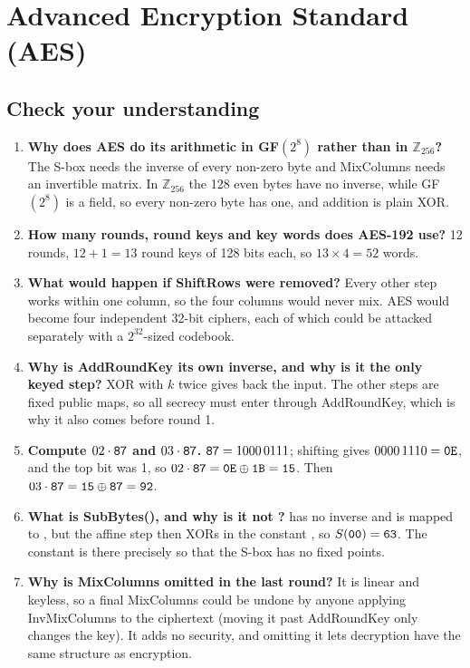 \section{Advanced Encryption Standard (AES)}\label{q:16_aes}

\subsection*{Check your understanding}
\begin{enumerate}[leftmargin=1.5em,itemsep=2pt]
  \item \textbf{Why does AES do its arithmetic in GF$(2^8)$ rather than in $\mathbb{Z}_{256}$?} The S-box needs the inverse of every non-zero byte and MixColumns needs an invertible matrix. In $\mathbb{Z}_{256}$ the 128 even bytes have no inverse, while GF$(2^8)$ is a field, so every non-zero byte has one, and addition is plain XOR.
  \item \textbf{How many rounds, round keys and key words does AES-192 use?} 12 rounds, $12 + 1 = 13$ round keys of 128 bits each, so $13 \times 4 = 52$ words.
  \item \textbf{What would happen if ShiftRows were removed?} Every other step works within one column, so the four columns would never mix. AES would become four independent 32-bit ciphers, each of which could be attacked separately with a $2^{32}$-sized codebook.
  \item \textbf{Why is AddRoundKey its own inverse, and why is it the only keyed step?} XOR with $k$ twice gives back the input. The other steps are fixed public maps, so all secrecy must enter through AddRoundKey, which is why it also comes before round 1.
  \item \textbf{Compute $02 \cdot \texttt{87}$ and $03 \cdot \texttt{87}$.} $\texttt{87} = 1000\,0111$; shifting gives $0000\,1110 = \texttt{0E}$, and the top bit was 1, so $02 \cdot \texttt{87} = \texttt{0E} \oplus \texttt{1B} = \texttt{15}$. Then $03 \cdot \texttt{87} = \texttt{15} \oplus \texttt{87} = \texttt{92}$.
  \item \textbf{What is SubBytes(), and why is it not ?}  has no inverse and is mapped to , but the affine step then XORs in the constant , so $S(\texttt{00}) = \texttt{63}$. The constant is there precisely so that the S-box has no fixed points.
  \item \textbf{Why is MixColumns omitted in the last round?} It is linear and keyless, so a final MixColumns could be undone by anyone applying InvMixColumns to the ciphertext (moving it past AddRoundKey only changes the key). It adds no security, and omitting it lets decryption have the same structure as encryption.

\end{enumerate}
